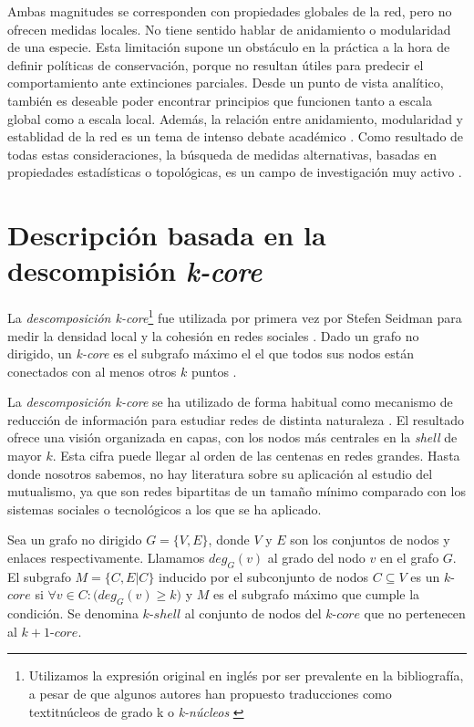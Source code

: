 Ambas magnitudes se corresponden con propiedades globales de la red, pero no ofrecen medidas locales. No tiene sentido hablar de anidamiento o modularidad de una especie. Esta limitación supone un obstáculo en la práctica a la hora de definir políticas de conservación, porque no resultan útiles para predecir el comportamiento ante extinciones parciales. Desde un punto de vista analítico, también es deseable poder encontrar principios que funcionen tanto a escala global como a escala local. 
Además, la relación entre anidamiento, modularidad y establidad de la red es un tema de intenso debate académico \cite{fortuna2010nestedness, james2012disentangling, staniczenko2013ghost, feng2014heterogeneity}. Como resultado de todas estas consideraciones, la búsqueda de medidas alternativas, basadas en propiedades estadísticas o topológicas, es un campo de investigación muy activo \cite{podani2014new,chagnon2015characterizing,strona2015new}.

\section{Descripción basada en la descompisión \textit{k-core}}

La \textit{descomposición k-core}\footnote{Utilizamos la expresión original en inglés por ser prevalente en la bibliografía, a pesar de que algunos autores han propuesto traducciones como textit{núcleos de grado k} \cite{herrero2000terminologia} o \textit{k-núcleos} \cite{cardona2006taxonomia, martinez2011aplicacion}} fue utilizada por primera vez por Stefen Seidman para medir la densidad local y la cohesión en redes sociales \cite{seidman1983network}. Dado un grafo no dirigido, un \textit{k-core} es el subgrafo máximo el el que todos sus nodos están conectados con al menos otros $k$ puntos \cite{dorogovtsev2006k}.

La \textit{descomposición k-core} se ha utilizado de forma habitual como mecanismo de reducción de información para estudiar redes de distinta naturaleza \cite{kitsak2010identification, zhang2010using, barbera2014critical}. El resultado ofrece una visión organizada en capas, con los nodos más centrales en la \textit{shell} de mayor $k$. Esta cifra puede llegar al orden de las centenas en redes grandes. Hasta donde nosotros sabemos, no hay literatura sobre su aplicación al estudio del mutualismo, ya que son redes bipartitas de un tamaño mínimo comparado con los sistemas sociales o tecnológicos a los que se ha aplicado.

\begin{theo} 
Sea un grafo no dirigido $G = \{V, E\}$, donde $V$ y $E$ son los conjuntos de nodos y enlaces respectivamente. Llamamos $deg_G(v)$ al grado del nodo $v$ en el grafo $G$. El subgrafo $M = \{C, E|C\}$ inducido por el subconjunto de nodos $C \subseteq V$ es
un $k$-$core$ si $\forall v \in C: \big( deg_G(v) \geq k \big)$ y $M$ es el subgrafo máximo que cumple la condición. Se denomina $k$-$shell$ al conjunto de nodos del $k$-$core$ que no pertenecen al $k+1$-$core$.
\label{ESTATICA_def_kcore}
\end{theo}

